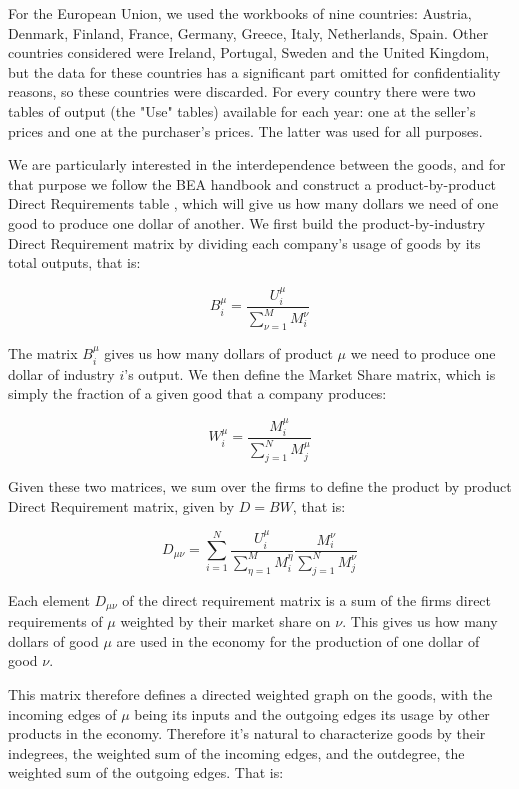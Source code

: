 For the European Union, we used the workbooks of
nine countries: Austria, Denmark, Finland, France, Germany, Greece,
Italy, Netherlands, Spain. Other countries considered were
Ireland, Portugal, Sweden and the United Kingdom, but the data for
these countries has a significant part omitted for
confidentiality reasons, so these countries were discarded. For every country there were two tables of output (the "Use" tables) available for each year:
one at the seller's prices and one at the purchaser's prices. The latter was used for all purposes.

We are particularly interested in the interdependence between the goods,
and for that purpose we follow the BEA handbook and construct a product-by-product Direct Requirements table
\cite{BEA_handbook}, which will give us how many dollars we need of
one good to produce one dollar of another. We first build the product-by-industry Direct Requirement matrix by
dividing each company's usage of goods by its total outputs, that is:

\begin{equation}
  \label{eq:dr_ic}
  B_i^\mu = \frac{U_i^\mu}{\sum_{\nu=1}^M M_i^\nu}
\end{equation}

The matrix $B_i^\mu$ gives us how many dollars of product $\mu$ we need to
produce one dollar of industry $i$'s output. We then define the
Market Share matrix, which is simply the fraction
of a given good that a company produces:

\begin{equation}
  \label{eq:market_share}
  W_i^\mu = \frac{M_i^\mu}{\sum_{j=1}^N M_j^\mu}
\end{equation}

Given these two matrices, we sum over the firms to define the product by product Direct
Requirement matrix, given by $D = B W$, that is:

\begin{equation}
  \label{eq:D}
  D_{\mu\nu} = \sum_{i=1}^N \frac{U_i^\mu}{\sum_{\eta=1}^M M_i^\eta} \frac{M_i^\nu}{\sum_{j=1}^N M_j^\nu}
\end{equation}

Each element $D_{\mu\nu}$ of the direct requirement matrix is a sum of
the firms direct requirements of $\mu$ weighted by their market share
on $\nu$. This gives us how many dollars of good $\mu$ are used in the
economy for the production of one dollar of good $\nu$.

This matrix therefore defines a directed weighted
graph on the goods, with the incoming edges of $\mu$ being its inputs
and the outgoing edges its usage by other products in the
economy. Therefore it's natural to characterize goods by their
indegrees, the weighted sum of the incoming edges, and the outdegree,
the weighted sum of the outgoing edges. That is:

